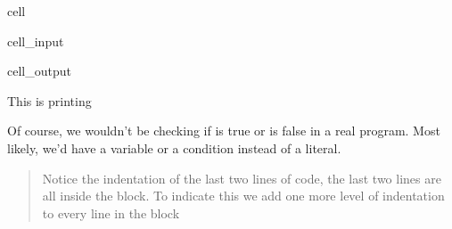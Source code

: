 \documentclass[letterpaper,10pt,english]{jupyterBook}
\begin{document}
\begin{sphinxuseclass}{cell}\begin{sphinxVerbatimInput}

\begin{sphinxuseclass}{cell_input}
\begin{sphinxVerbatim}[commandchars=\\\{\}]
 
     
 
     
\end{sphinxVerbatim}

\end{sphinxuseclass}\end{sphinxVerbatimInput}
\begin{sphinxVerbatimOutput}

\begin{sphinxuseclass}{cell_output}
\begin{sphinxVerbatim}[commandchars=\\\{\}]
This is printing
\end{sphinxVerbatim}

\end{sphinxuseclass}\end{sphinxVerbatimOutput}

\end{sphinxuseclass}
\sphinxAtStartPar
Of course, we wouldn’t be checking if  is true or  is false in a real program.
Most likely, we’d have a variable or a condition instead of a literal.
\begin{quote}

\sphinxAtStartPar
Notice the indentation of the last two lines of code, the last two lines are all inside the  block. To indicate this we add one more level of indentation to every line in the block
\end{quote}
\end{document}
